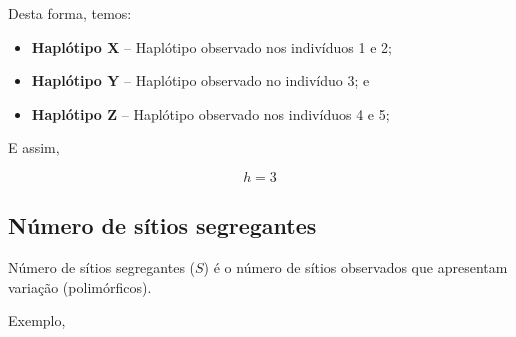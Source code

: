 \documentclass[
]{book}
\begin{document}
Desta forma, temos:

\begin{itemize}
\item
  \textbf{Haplótipo X} -- Haplótipo observado nos indivíduos 1 e 2;
\item
  \textbf{Haplótipo Y} -- Haplótipo observado no indivíduo 3; e
\item
  \textbf{Haplótipo Z} -- Haplótipo observado nos indivíduos 4 e 5;
\end{itemize}

E assim,

\[h = 3\]

\hypertarget{nuxfamero-de-suxedtios-segregantes}{%
\subsection{Número de sítios segregantes}\label{nuxfamero-de-suxedtios-segregantes}}

Número de sítios segregantes (\(S\)) é o número de sítios observados que apresentam variação (polimórficos).

Exemplo,
\end{document}
